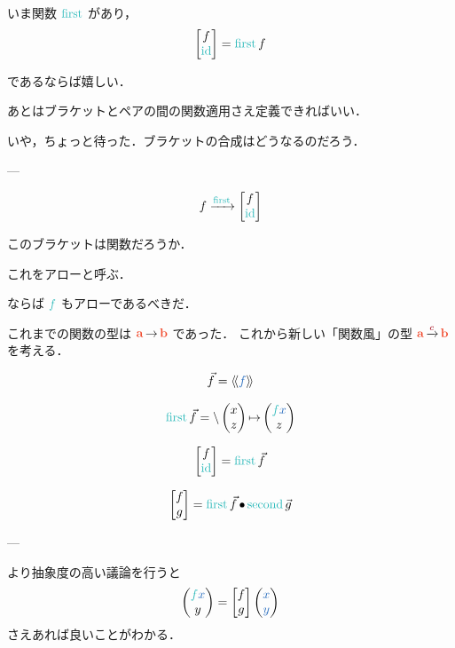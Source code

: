 \documentclass[a5paper,twoside,fleqn,draft]{jsbook}
\begin{document}
いま関数 $\mFirst$ があり，
\begin{equation}
  \begin{bmatrix}
    f\\
    \mId
  \end{bmatrix}
  =\mFirst f
\end{equation}


であるならば嬉しい．

あとはブラケットとペアの間の関数適用さえ定義できればいい．

いや，ちょっと待った．ブラケットの合成はどうなるのだろう．

---

\begin{equation}
  f
  \xrightarrow{\mFirst}
  \begin{bmatrix}
    f\\
    \mId
  \end{bmatrix}
\end{equation}

このブラケットは関数だろうか．

これをアローと呼ぶ．

ならば $\hFunc{f}$ もアローであるべきだ．

これまでの関数の型は $\mA\mFuncArrow\mB$ であった．
これから新しい「関数風」の型 $\mA\mCatArrowC\mB$ を考える．

\begin{equation}
  \Vec{f}
  =\mArrowWith{f}
\end{equation}

\begin{equation}
  \mFirst\Vec{f}
  =\mLambda{\mPairWith{x}{z}}\mLambdaArrow\mPairWith{\hFunc{f}\hVar{x}}{z}
\end{equation}

\begin{equation}
  \begin{bmatrix}
    f\\
    \mId
  \end{bmatrix}
  =\mFirst\Vec{f}
\end{equation}

\begin{equation}
  \begin{bmatrix}
    f\\g
  \end{bmatrix}
  =\mFirst\Vec{f}\mCompCat\mSecond\Vec{g}
\end{equation}

---

より抽象度の高い議論を行うと
\begin{equation}
  \mPairWith{\hFunc{f}\hVar{x}}{y}
  =\begin{bmatrix}f\\g\end{bmatrix}
  \mPairWith{\hVar{x}}{\hVar{y}}
\end{equation}
さえあれば良いことがわかる．
\end{document}
